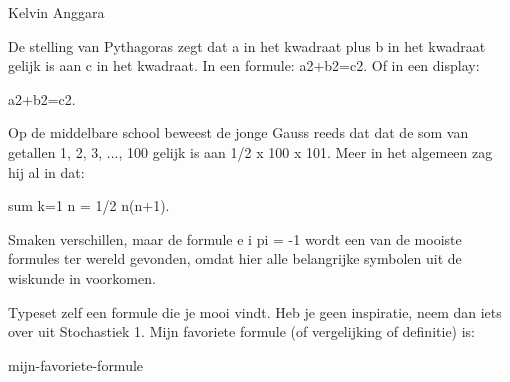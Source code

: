\documentclass[a4paper]{article}
\begin{document}
Kelvin Anggara

De stelling van Pythagoras zegt dat a in het kwadraat plus b in het kwadraat gelijk is aan c in het kwadraat.
In een formule: a2+b2=c2. Of in een display:

a2+b2=c2.

Op de middelbare school beweest de jonge Gauss reeds dat dat de som van getallen 1, 2, 3, ..., 100 gelijk is aan 1/2 x 100 x 101. Meer in het algemeen zag hij al in dat:

sum k=1 n = 1/2 n(n+1).

Smaken verschillen, maar de formule e i pi = -1 wordt een van de mooiste formules ter wereld gevonden, omdat hier alle belangrijke symbolen uit de wiskunde in voorkomen.

Typeset zelf een formule die je mooi vindt. Heb je geen inspiratie, neem dan iets over uit Stochastiek 1. Mijn favoriete formule (of vergelijking of definitie) is:

mijn-favoriete-formule
\end{document}
